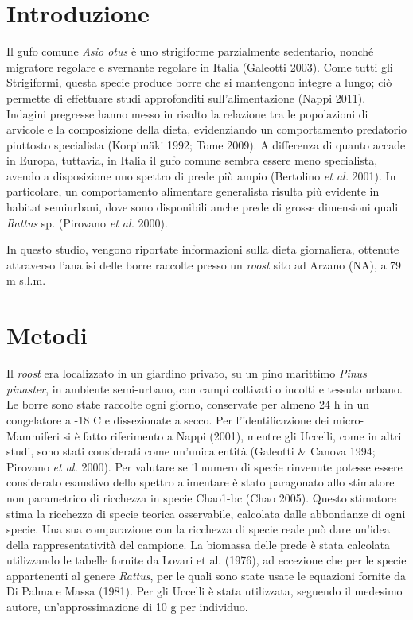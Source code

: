 \section*{Introduzione}
Il gufo comune \textit{Asio otus} \`e uno strigiforme parzialmente
sedentario, nonch\'e migratore regolare e svernante regolare in Italia
(Galeotti 2003). Come tutti gli Strigiformi, questa specie produce
borre che si mantengono integre a lungo; ci\`o permette di effettuare
studi approfonditi sull{\textquoteright}alimentazione (Nappi 2011).
Indagini pregresse hanno messo in risalto la relazione tra le
popolazioni di arvicole e la composizione della dieta, evidenziando un
comportamento predatorio piuttosto specialista (Korpim\"aki 1992; Tome
2009). A differenza di quanto accade in Europa, tuttavia, in Italia il
gufo comune sembra essere meno specialista, avendo a disposizione uno
spettro di prede pi\`u ampio (Bertolino \textit{et al.} 2001). In
particolare, un comportamento alimentare generalista risulta pi\`u
evidente in habitat semiurbani, dove sono disponibili anche prede di
grosse dimensioni quali \textit{Rattus }sp. (Pirovano \textit{et al.}
2000).

In questo studio, vengono riportate informazioni sulla dieta
giornaliera, ottenute attraverso l{\textquoteright}analisi delle borre
raccolte presso un \textit{roost} sito ad Arzano (NA), a 79 m s.l.m. 

\section*{Metodi}

Il \textit{roost} era localizzato in un giardino privato, su un pino
marittimo \textit{Pinus pinaster}, in ambiente semi-urbano, con campi
coltivati o incolti e tessuto urbano. Le borre sono state raccolte ogni
giorno, conservate per almeno 24 h in un congelatore a -18
{\textdegree}C e dissezionate a secco. Per
l{\textquoteright}identificazione dei micro-Mammiferi si \`e fatto
riferimento a Nappi (2001), mentre gli Uccelli, come in altri studi,
sono stati considerati come un{\textquoteright}unica entit\`a (Galeotti
\& Canova 1994; Pirovano \textit{et al.} 2000). Per valutare se il
numero di specie rinvenute potesse essere considerato esaustivo dello
spettro alimentare \`e stato paragonato allo stimatore non parametrico
di ricchezza in specie Chao1-bc (Chao 2005). Questo stimatore stima la
ricchezza di specie teorica osservabile, calcolata dalle abbondanze di
ogni specie. Una sua comparazione con la ricchezza di specie reale
pu\`o dare un{\textquoteright}idea della rappresentativit\`a del
campione. La biomassa delle prede \`e stata calcolata utilizzando le
tabelle fornite da Lovari et al. (1976), ad eccezione che per le specie
appartenenti al genere \textit{Rattus}, per le quali sono state usate
le equazioni fornite da Di Palma e Massa (1981). Per gli Uccelli \`e
stata utilizzata, seguendo il medesimo autore,
un{\textquoteright}approssimazione di 10 g per individuo.

